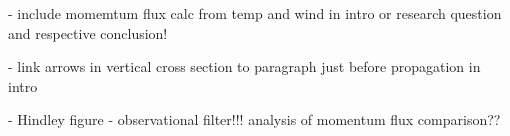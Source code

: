 - include momemtum flux calc from temp and wind in intro or research question and respective conclusion!

- link arrows in vertical cross section to paragraph just before propagation in intro

- Hindley figure - observational filter!!! analysis of momentum flux comparison??

